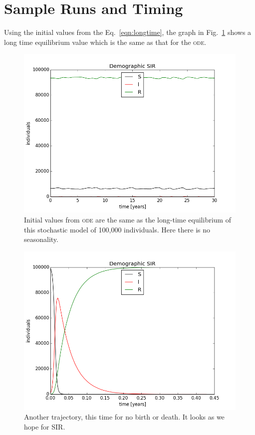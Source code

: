 \documentclass{article}
\begin{document}




\section{Sample Runs and Timing}
Using the initial values from the Eq.~\ref{eqn:longtime}, the graph
in Fig.~\ref{fig:longbehavior} shows a long time equilibrium value
which is the same as that for the \textsc{ode}.
\begin{figure}
\centerline{\includegraphics[scale=1.0]{fixed_no_seasonal}}
\caption{Initial values from \textsc{ode} are the same as the long-time
equilibrium of this stochastic model of 100,000 individuals.
Here there is no seasonality.\label{fig:longbehavior}}
\end{figure}

\begin{figure}
\centerline{\includegraphics[scale=1.0]{feeling_better}}
\caption{Another trajectory, this time for no birth or death.
It looks as we hope for SIR.\label{fig:longexact}}
\end{figure}
\end{document}
